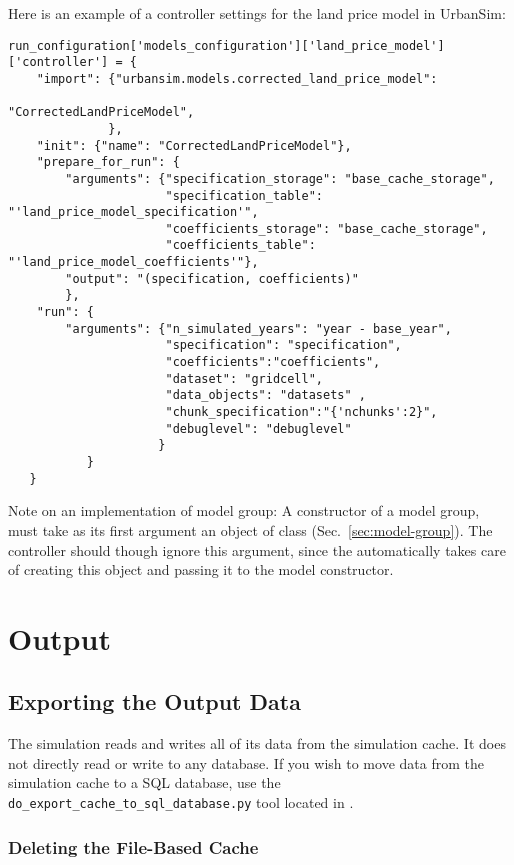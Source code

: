 Here is an example of a controller settings for the land price model in UrbanSim:

\begin{verbatim}
run_configuration['models_configuration']['land_price_model']['controller'] = {
    "import": {"urbansim.models.corrected_land_price_model":
                                                "CorrectedLandPriceModel",
              },
    "init": {"name": "CorrectedLandPriceModel"},
    "prepare_for_run": {
        "arguments": {"specification_storage": "base_cache_storage",
                      "specification_table": "'land_price_model_specification'",
                      "coefficients_storage": "base_cache_storage",
                      "coefficients_table": "'land_price_model_coefficients'"},
        "output": "(specification, coefficients)"
        },
    "run": {
        "arguments": {"n_simulated_years": "year - base_year",
                      "specification": "specification",
                      "coefficients":"coefficients",
                      "dataset": "gridcell",
                      "data_objects": "datasets" ,
                      "chunk_specification":"{'nchunks':2}",
                      "debuglevel": "debuglevel"
                     }
           }
   }
\end{verbatim}
Note on an implementation of model group: A constructor of 
a model group, must take as its first argument an object of class  (Sec.~\ref{sec:model-group}). 
The controller should though ignore this argument, since the  automatically takes care of creating this object 
and passing it to the model constructor.

\section{Output}
%
\subsection{Exporting the Output Data}

The simulation reads and writes all of its data from the simulation cache.  It 
does not directly read or write to any database. 
If you wish to move data from the simulation cache to a SQL database, use the
\verb|do_export_cache_to_sql_database.py| tool located in
. 


\subsubsection{Deleting the File-Based Cache}

